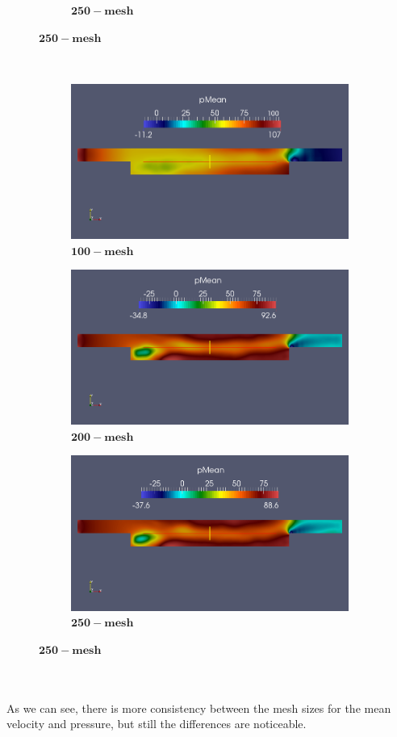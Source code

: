 \documentclass[a4paper,english,12pt,twoside]{article}
\begin{document}
\begin{figure}[h!]
\begin{subfigure}{0.3\textwidth}
		\caption{$\mathbf{250-mesh}$}
	\end{subfigure}
\end{figure}\\
\begin{figure}[h!]
	\begin{subfigure}{0.3\textwidth}
		\includegraphics[width=0.95\linewidth]{piso_10_filteredLinear_mean_p.png}
		\caption{$\mathbf{100-mesh}$}
	\end{subfigure}
	\begin{subfigure}{0.3\textwidth}
		\includegraphics[width=0.95\linewidth]{piso_20_filteredLinear_mean_p.png}
		\caption{$\mathbf{200-mesh}$}
	\end{subfigure}
	\begin{subfigure}{0.3\textwidth}
		\includegraphics[width=0.95\linewidth]{piso_25_filteredLinear_mean_p.png}
		\caption{$\mathbf{250-mesh}$}
	\end{subfigure}
\end{figure}\\
\\
As we can see, there is more consistency between the mesh sizes for the mean velocity and pressure, but still the differences are noticeable.
\end{document}
